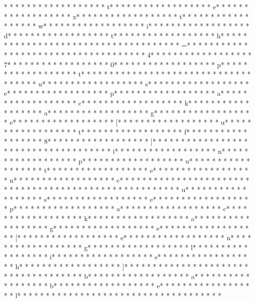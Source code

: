 * * *  * * *  * * *  *  * * *  *  * * *  * t* * *  * * *  * * *  *  * * *  *  * * *  * e* * *  * * *  * * *  *  * * *  *  * * *  * x* * *  * * *  * * *  *  * * *  *  * * *  * t* * *  * * *  * * *  *  * * *  *  * * *  * w* * *  * * *  * * *  *  * * *  *  * * *  * i* * *  * * *  * * *  *  * * *  *  * * *  * d* * *  * * *  * * *  *  * * *  *  * * *  * t* * *  * * *  * * *  *  * * *  *  * * *  * h* * *  * * *  * * *  *  * * *  *  * * *  *  * * *  * * *  * * *  *  * * *  *  * * *  * =* * *  * * *  * * *  *  * * *  *  * * *  *  * * *  * * *  * * *  *  * * *  *  * * *  * 4* * *  * * *  * * *  *  * * *  *  * * *  * 7* * *  * * *  * * *  *  * * *  *  * * *  * 0* * *  * * *  * * *  *  * * *  *  * * *  * p* * *  * * *  * * *  *  * * *  *  * * *  * t* * *  * * *  * * *  *  * * *  *  * * *  * 
* * *  * * *  * * *  *  * * *  *  * * *  * u* * *  * * *  * * *  *  * * *  *  * * *  * s* * *  * * *  * * *  *  * * *  *  * * *  * e* * *  * * *  * * *  *  * * *  *  * * *  * p* * *  * * *  * * *  *  * * *  *  * * *  * a* * *  * * *  * * *  *  * * *  *  * * *  * c* * *  * * *  * * *  *  * * *  *  * * *  * k* * *  * * *  * * *  *  * * *  *  * * *  * a* * *  * * *  * * *  *  * * *  *  * * *  * g* * *  * * *  * * *  *  * * *  *  * * *  * e* * *  * * *  * * *  *  * * *  *  * * *  * [* * *  * * *  * * *  *  * * *  *  * * *  * u* * *  * * *  * * *  *  * * *  *  * * *  * t* * *  * * *  * * *  *  * * *  *  * * *  * f* * *  * * *  * * *  *  * * *  *  * * *  * 8* * *  * * *  * * *  *  * * *  *  * * *  * ]* * *  * * *  * * *  *  * * *  *  * * *  * {* * *  * * *  * * *  *  * * *  *  * * *  * i* * *  * * *  * * *  *  * * *  *  * * *  * n* * *  * * *  * * *  *  * * *  *  * * *  * p* * *  * * *  * * *  *  * * *  *  * * *  * u* * *  * * *  * * *  *  * * *  *  * * *  * t* * *  * * *  * * *  *  * * *  *  * * *  * e* * *  * * *  * * *  *  * * *  *  * * *  * n* * *  * * *  * * *  *  * * *  *  * * *  * c* * *  * * *  * * *  *  * * *  *  * * *  * }* * *  * * *  * * *  *  * * *  *  * * *  * 
* * *  * * *  * * *  *  * * *  *  * * *  * u* * *  * * *  * * *  *  * * *  *  * * *  * s* * *  * * *  * * *  *  * * *  *  * * *  * e* * *  * * *  * * *  *  * * *  *  * * *  * p* * *  * * *  * * *  *  * * *  *  * * *  * a* * *  * * *  * * *  *  * * *  *  * * *  * c* * *  * * *  * * *  *  * * *  *  * * *  * k* * *  * * *  * * *  *  * * *  *  * * *  * a* * *  * * *  * * *  *  * * *  *  * * *  * g* * *  * * *  * * *  *  * * *  *  * * *  * e* * *  * * *  * * *  *  * * *  *  * * *  * [* * *  * * *  * * *  *  * * *  *  * * *  * e* * *  * * *  * * *  *  * * *  *  * * *  * n* * *  * * *  * * *  *  * * *  *  * * *  * g* * *  * * *  * * *  *  * * *  *  * * *  * l* * *  * * *  * * *  *  * * *  *  * * *  * i* * *  * * *  * * *  *  * * *  *  * * *  * s* * *  * * *  * * *  *  * * *  *  * * *  * h* * *  * * *  * * *  *  * * *  *  * * *  * ]* * *  * * *  * * *  *  * * *  *  * * *  * {* * *  * * *  * * *  *  * * *  *  * * *  * b* * *  * * *  * * *  *  * * *  *  * * *  * a* * *  * * *  * * *  *  * * *  *  * * *  * b* * *  * * *  * * *  *  * * *  *  * * *  * e* * *  * * *  * * *  *  * * *  *  * * *  * l* * *  * * *  * * *  *  * * *  *  * * *  * }* * *  * * *  * * *  *  * * *  *  * * *  * 
